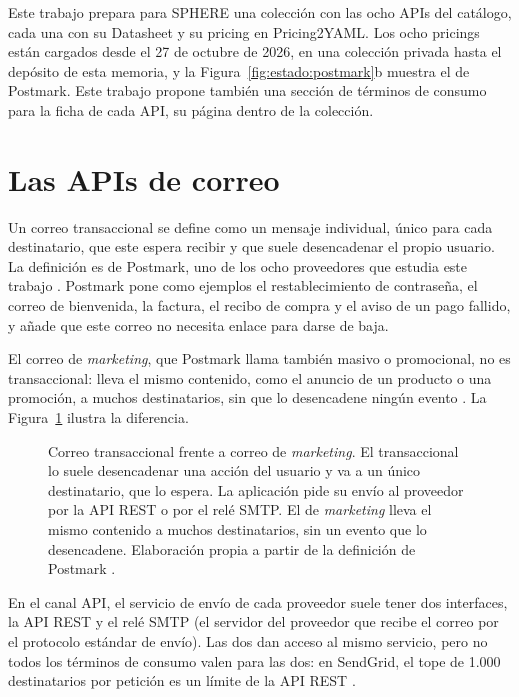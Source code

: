 Este trabajo prepara para SPHERE una colección con las ocho APIs del
catálogo, cada una con su Datasheet y su pricing en Pricing2YAML. Los
ocho pricings están cargados desde el 27 de octubre de 2026, en una
colección privada hasta el depósito de esta memoria, y la
Figura~\ref{fig:estado:postmark}b muestra el de Postmark.
Este trabajo propone también una sección de términos de consumo para la
ficha de cada API, su página dentro de la colección.

\section{Las APIs de correo}
\label{sec:estado:correo}

Un correo transaccional se define como un mensaje individual, único para
cada destinatario, que este espera recibir y que suele desencadenar el
propio usuario. La definición es de Postmark, uno de los ocho proveedores
que estudia este trabajo \citep{postmarktransaccional}. Postmark pone
como ejemplos el restablecimiento de contraseña, el correo de bienvenida,
la factura, el recibo de compra y el aviso de un pago fallido, y añade
que este correo no necesita enlace para darse de baja.

El correo de \textit{marketing}, que Postmark llama también masivo o
promocional, no es transaccional: lleva el mismo contenido, como el
anuncio de un producto o una promoción, a muchos destinatarios, sin que
lo desencadene ningún evento \citep{postmarktransaccional}. La
Figura~\ref{fig:estado:transaccional} ilustra la diferencia.

\begin{figure}[tbp]
\centering

\caption[Correo transaccional frente a correo de \textit{marketing}]{Correo transaccional frente a correo de \textit{marketing}. El transaccional lo suele desencadenar una acción del usuario y va a un único destinatario, que lo espera. La aplicación pide su envío al proveedor por la API REST o por el relé SMTP. El de \textit{marketing} lleva el mismo contenido a muchos destinatarios, sin un evento que lo desencadene. Elaboración propia a partir de la definición de Postmark \citep{postmarktransaccional}.}
\label{fig:estado:transaccional}
\end{figure}

En el canal API, el servicio de envío de
cada proveedor suele tener dos interfaces, la API REST y el relé SMTP (el
servidor del proveedor que recibe el correo por el protocolo estándar de
envío). Las dos dan acceso al mismo servicio, pero no todos los términos de
consumo valen para las dos: en SendGrid, el tope de 1.000 destinatarios por
petición es un límite de la API REST \citep{sendgriddocs}.

